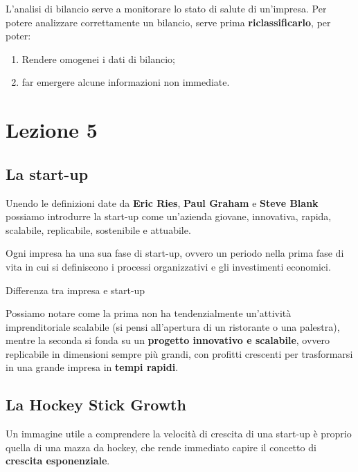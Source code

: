 \documentclass[14pt]{extarticle}
\begin{document}
L'analisi di bilancio serve a monitorare lo stato di salute di un'impresa. Per
potere analizzare correttamente un bilancio, serve prima
\textbf{riclassificarlo}, per poter:

\begin{enumerate}
    \item Rendere omogenei i dati di bilancio;
    \item far emergere alcune informazioni non immediate.
\end{enumerate}

\section{Lezione 5}

\subsection{La start-up}

Unendo le definizioni date da \textbf{Eric Ries}, \textbf{Paul Graham} e
\textbf{Steve Blank} possiamo introdurre la start-up come un'azienda giovane,
innovativa, rapida, scalabile, replicabile, sostenibile e attuabile.

Ogni impresa ha una sua fase di start-up, ovvero un periodo nella prima fase di
vita in cui si definiscono i processi organizzativi e gli investimenti
economici.

\begin{center}
    \textcolor{red!50}{Differenza tra impresa e start-up}
\end{center}
Possiamo notare come la prima non ha tendenzialmente un'attività imprenditoriale
scalabile (si pensi all'apertura di un ristorante o una palestra), mentre la
seconda si fonda su un \textbf{progetto innovativo e scalabile}, ovvero
replicabile in dimensioni sempre più grandi, con profitti crescenti per
trasformarsi in una grande impresa in \textbf{tempi rapidi}.

\newpage
\subsection{La Hockey Stick Growth}

Un immagine utile a comprendere la velocità di crescita di una start-up è
proprio quella di una mazza da hockey, che rende immediato capire il concetto di
\textbf{crescita esponenziale}.
\end{document}
